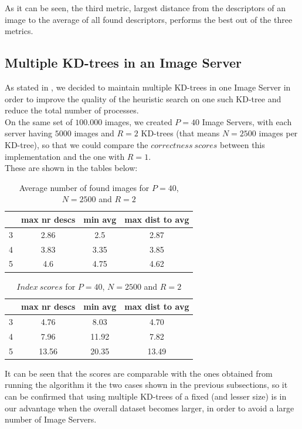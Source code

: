 As it can be seen, the third metric, largest distance from the descriptors of an image to the average of all found descriptors, performs the best out of the three metrics.\\

\subsection{Multiple KD-trees in an Image Server}

As stated in , we decided to maintain multiple KD-trees in one Image Server in order to improve the quality of the heuristic search on one such KD-tree and reduce the total number of processes.\\
On the same set of $100.000$ images, we created $P=40$ Image Servers, with each server having $5000$ images and $R=2$ KD-trees (that means $N=2500$ images per KD-tree), so that we could compare the $correctness\ scores$ between this implementation and the one with $R=1$.\\
These are shown in the tables below:\\

\begin{table}[H]
\centering
\begin{tabular} {c | c | c | c}
	& max nr descs & min avg & max dist to avg \\
	\hline
	3 & 2.86 & 2.5 & 2.87 \\
	\hline
	4 & 3.83 & 3.35 & 3.85 \\
	\hline
	5 & 4.6 & 4.75 & 4.62 \\
\end{tabular}
\caption{Average number of found images for $P=40$, $N=2500$ and $R=2$}
\end{table}

\begin{table}[H]
\centering
\begin{tabular} {c | c | c | c}
	& max nr descs & min avg & max dist to avg \\
	\hline
	3 & 4.76 & 8.03 & 4.70 \\
	\hline
	4 & 7.96 & 11.92 & 7.82 \\
	\hline
	5 & 13.56 & 20.35 & 13.49 \\
\end{tabular}
\caption{$Index\ scores$ for $P=40$, $N=2500$ and $R=2$}
\end{table}

It can be seen that the scores are comparable with the ones obtained from running the algorithm it the two cases shown in the previous subsections, so it can be confirmed that using multiple KD-trees of a fixed (and lesser size) is in our advantage when the overall dataset becomes larger, in order to avoid a large number of Image Servers.
 
